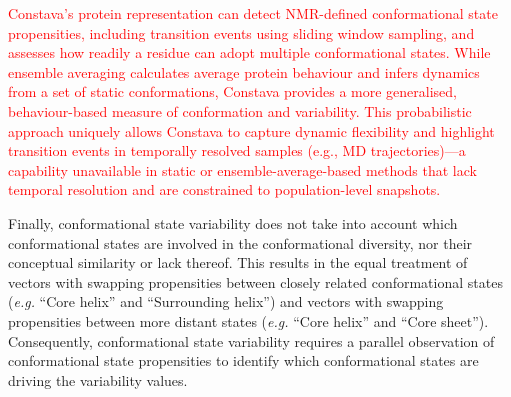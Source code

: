 
\textcolor{red}{Constava’s protein representation can detect NMR-defined conformational state propensities, including transition events using sliding window sampling, and assesses how readily a residue can adopt multiple conformational states. While ensemble averaging calculates average protein behaviour and infers dynamics from a set of static conformations, Constava provides a more generalised, behaviour-based measure of conformation and variability. This probabilistic approach uniquely allows Constava to capture dynamic flexibility and highlight transition events in temporally resolved samples (e.g., MD trajectories)—a capability unavailable in static or ensemble-average-based methods that lack temporal resolution and are constrained to population-level snapshots.}


Finally, conformational state variability does not take into account which conformational states are involved in the conformational diversity, nor their conceptual similarity or lack thereof. This results in the equal treatment of vectors with swapping propensities between closely related conformational states (\textit{e.g.} ``Core helix'' and ``Surrounding helix'') and vectors with swapping propensities between more distant states (\textit{e.g.} ``Core helix'' and ``Core sheet''). Consequently, conformational state variability requires a parallel observation of conformational state propensities to identify which conformational states are driving the variability values.




